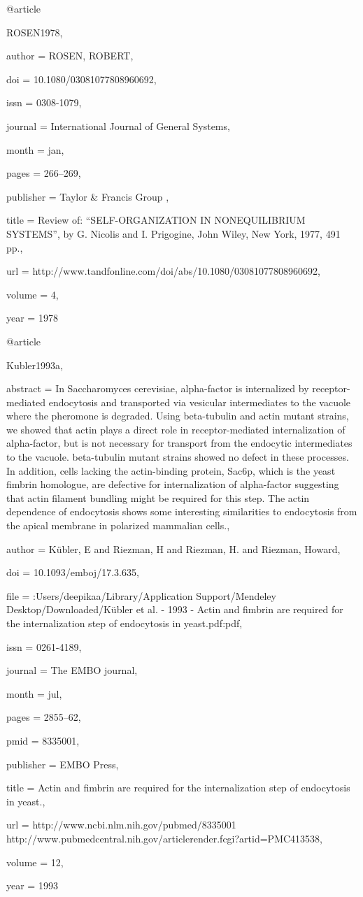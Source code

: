 @article{ROSEN1978,

author = {ROSEN, ROBERT},

doi = {10.1080/03081077808960692},

issn = {0308-1079},

journal = {International Journal of General Systems},

month = {jan},

pages = {266--269},

publisher = { Taylor {\&} Francis Group },

title = {{Review of: “SELF-ORGANIZATION IN NONEQUILIBRIUM SYSTEMS”, by G. Nicolis and I. Prigogine, John Wiley, New York, 1977, 491 pp.}},

url = {http://www.tandfonline.com/doi/abs/10.1080/03081077808960692},

volume = {4},

year = {1978}

}

@article{Kubler1993a,

abstract = {In Saccharomyces cerevisiae, alpha-factor is internalized by receptor-mediated endocytosis and transported via vesicular intermediates to the vacuole where the pheromone is degraded. Using beta-tubulin and actin mutant strains, we showed that actin plays a direct role in receptor-mediated internalization of alpha-factor, but is not necessary for transport from the endocytic intermediates to the vacuole. beta-tubulin mutant strains showed no defect in these processes. In addition, cells lacking the actin-binding protein, Sac6p, which is the yeast fimbrin homologue, are defective for internalization of alpha-factor suggesting that actin filament bundling might be required for this step. The actin dependence of endocytosis shows some interesting similarities to endocytosis from the apical membrane in polarized mammalian cells.},

author = {K{\"{u}}bler, E and Riezman, H and Riezman, H. and Riezman, Howard},

doi = {10.1093/emboj/17.3.635},

file = {:Users/deepikaa/Library/Application Support/Mendeley Desktop/Downloaded/K{\"{u}}bler et al. - 1993 - Actin and fimbrin are required for the internalization step of endocytosis in yeast.pdf:pdf},

issn = {0261-4189},

journal = {The EMBO journal},

month = {jul},

pages = {2855--62},

pmid = {8335001},

publisher = {EMBO Press},

title = {{Actin and fimbrin are required for the internalization step of endocytosis in yeast.}},

url = {http://www.ncbi.nlm.nih.gov/pubmed/8335001 http://www.pubmedcentral.nih.gov/articlerender.fcgi?artid=PMC413538},

volume = {12},

year = {1993}

}

